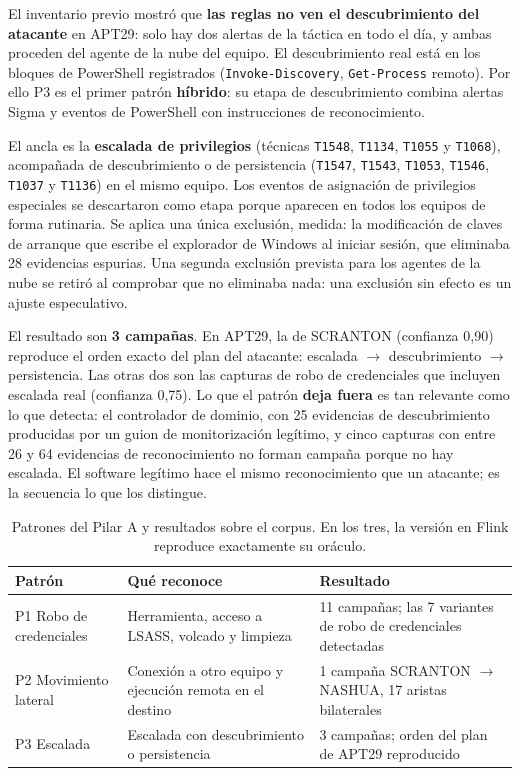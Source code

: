 El inventario previo mostró que \textbf{las reglas no ven el descubrimiento del atacante}
en APT29: solo hay dos alertas de la táctica en todo el día, y ambas proceden del agente de
la nube del equipo. El descubrimiento real está en los bloques de PowerShell registrados
(\texttt{Invoke-Discovery}, \texttt{Get-Process} remoto). Por ello P3 es el primer patrón
\textbf{híbrido}: su etapa de descubrimiento combina alertas Sigma y eventos de PowerShell
con instrucciones de reconocimiento.

El ancla es la \textbf{escalada de privilegios} (técnicas \texttt{T1548}, \texttt{T1134},
\texttt{T1055} y \texttt{T1068}), acompañada de descubrimiento o de persistencia
(\texttt{T1547}, \texttt{T1543}, \texttt{T1053}, \texttt{T1546}, \texttt{T1037} y
\texttt{T1136}) en el mismo equipo. Los eventos de asignación de privilegios especiales se
descartaron como etapa porque aparecen en todos los equipos de forma rutinaria. Se aplica
una única exclusión, medida: la modificación de claves de arranque que escribe el
explorador de Windows al iniciar sesión, que eliminaba 28 evidencias espurias. Una segunda
exclusión prevista para los agentes de la nube se retiró al comprobar que no eliminaba
nada: una exclusión sin efecto es un ajuste especulativo.

El resultado son \textbf{3 campañas}. En APT29, la de SCRANTON (confianza 0,90) reproduce
el orden exacto del plan del atacante: escalada $\rightarrow$ descubrimiento $\rightarrow$
persistencia. Las otras dos son las capturas de robo de credenciales que incluyen escalada
real (confianza 0,75). Lo que el patrón \textbf{deja fuera} es tan relevante como lo que
detecta: el controlador de dominio, con 25 evidencias de descubrimiento producidas por un
guion de monitorización legítimo, y cinco capturas con entre 26 y 64 evidencias de
reconocimiento no forman campaña porque no hay escalada. El software legítimo hace el mismo
reconocimiento que un atacante; es la secuencia lo que los distingue.

\begin{table}[H]
\centering
\small
\begin{tabular}{|l|p{4.3cm}|p{5.2cm}|}
\hline
\textbf{Patrón} & \textbf{Qué reconoce} & \textbf{Resultado} \\
\hline
P1 Robo de credenciales & Herramienta, acceso a LSASS, volcado y limpieza & 11 campañas; las 7 variantes de robo de credenciales detectadas \\
\hline
P2 Movimiento lateral & Conexión a otro equipo y ejecución remota en el destino & 1 campaña SCRANTON $\rightarrow$ NASHUA, 17 aristas bilaterales \\
\hline
P3 Escalada & Escalada con descubrimiento o persistencia & 3 campañas; orden del plan de APT29 reproducido \\
\hline
\end{tabular}
\caption{Patrones del Pilar A y resultados sobre el corpus. En los tres, la versión en
Flink reproduce exactamente su oráculo.}
\label{tab:patrones}
\end{table}

